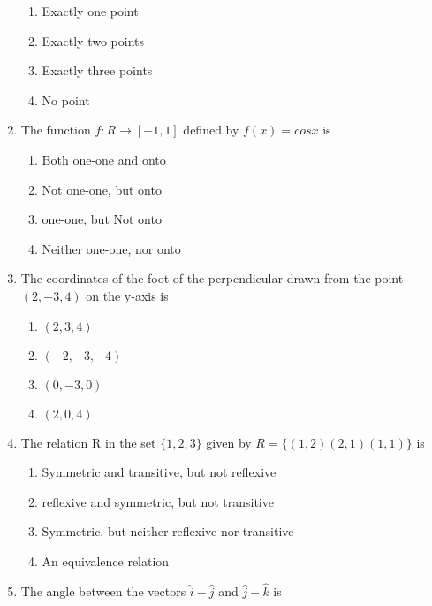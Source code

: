 \documentclass[journal,12pt,twocolumn]{IEEEtran}
\renewcommand\thesection{\arabic{section}}
\begin{document}
\begin{enumerate}[label=\thesection.\arabic*.,ref=\thesection.\theenumi]
\begin{enumerate}
    \item Exactly one point
    \item Exactly two points
    \item Exactly three points
    \item No point
\end{enumerate}

\item The function  $ f : R \rightarrow \left[-1,1 \right] $ defined by $ f\left(x \right) = cosx $ is

\begin{enumerate}
    \item Both one-one and onto
    \item Not one-one, but onto
    \item one-one, but Not onto
    \item Neither one-one, nor onto
\end{enumerate}

\item  The coordinates of the foot of the perpendicular drawn from the point $ \left(2,-3,4 \right) $ on the y-axis is 

\begin{enumerate}
    \item $\left(2,3,4\right)$
    \item $\left(-2,-3,-4\right)$
    \item $\left(0,-3,0\right)$
    \item $\left(2,0,4\right)$
\end{enumerate}

\item  The relation R in the set $ \{1,2,3\}$  given by $R=\{(1,2)(2,1)(1,1)\}$ is

\begin{enumerate}
    \item Symmetric and transitive, but not reflexive  \\
    \item reflexive and symmetric, but not transitive  \\
    \item Symmetric, but neither reflexive nor transitive \\
    \item An equivalence relation 
\end{enumerate}
\item  The angle between the vectors $ \hat{i} - \hat{j} $ and $ \hat{j} - \hat{k} $ is


\end{enumerate}
\end{document}

